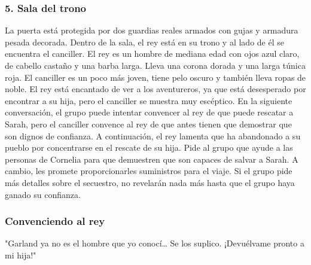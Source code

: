 \subsubsection*{5. Sala del trono}
La puerta está protegida por dos guardias reales armados con gujas y armadura pesada decorada. Dentro de la sala, el rey está en su trono y al lado de él se encuentra el canciller. El rey es un hombre de mediana edad con ojos azul claro, de cabello castaño y una barba larga. Lleva una corona dorada y una larga túnica roja. El canciller es un poco más joven, tiene pelo oscuro y también lleva ropas de noble. El rey está encantado de ver a los aventureros, ya que está desesperado por encontrar a su hija, pero el canciller se muestra muy escéptico. En la siguiente conversación, el grupo puede intentar convencer al rey de que puede rescatar a Sarah, pero el canciller convence al rey de que antes tienen que demostrar que son dignos de confianza. A continuación, el rey lamenta que ha abandonado a su pueblo por concentrarse en el rescate de su hija. Pide al grupo que ayude a las personas de Cornelia para que demuestren que son capaces de salvar a Sarah. A cambio, les promete proporcionarles suministros para el viaje. Si el grupo pide más detalles sobre el secuestro, no revelarán nada más hasta que el grupo haya ganado su confianza. 

\subsubsection*{Convenciendo al rey}
"Garland ya no es el hombre que yo conocí… Se los suplico. ¡Devuélvame pronto a mi hija!"

